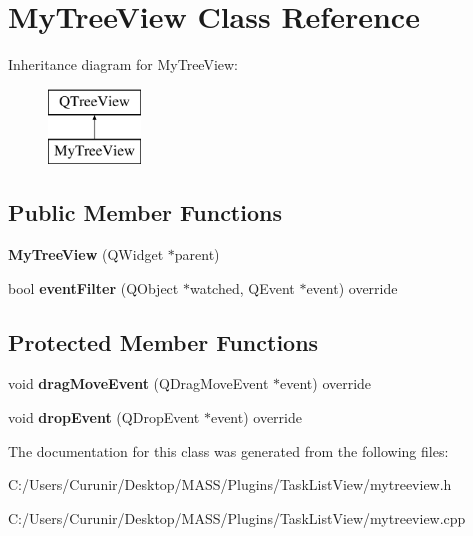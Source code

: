 \hypertarget{class_my_tree_view}{}\section{My\+Tree\+View Class Reference}
\label{class_my_tree_view}
Inheritance diagram for My\+Tree\+View\+:\begin{figure}[H]
\begin{center}
\leavevmode
\includegraphics[height=2.000000cm]{class_my_tree_view}
\end{center}
\end{figure}
\subsection*{Public Member Functions}
\begin{DoxyCompactItemize}
\item 
\mbox{\label{class_my_tree_view_a0152950a0b3c03fa3c17f2b5bcacfde1}} 
{\bfseries My\+Tree\+View} (Q\+Widget $\ast$parent)
\item 
\mbox{\label{class_my_tree_view_aa40b314b7834999905769ac19a21ad7d}} 
bool {\bfseries event\+Filter} (Q\+Object $\ast$watched, Q\+Event $\ast$event) override
\end{DoxyCompactItemize}
\subsection*{Protected Member Functions}
\begin{DoxyCompactItemize}
\item 
\mbox{\label{class_my_tree_view_afff3909f705a25758b55cc5ac0d9cf69}} 
void {\bfseries drag\+Move\+Event} (Q\+Drag\+Move\+Event $\ast$event) override
\item 
\mbox{\label{class_my_tree_view_adba311eaf413fc319f875a43e8bc1bdb}} 
void {\bfseries drop\+Event} (Q\+Drop\+Event $\ast$event) override
\end{DoxyCompactItemize}


The documentation for this class was generated from the following files\+:\begin{DoxyCompactItemize}
\item 
C\+:/\+Users/\+Curunir/\+Desktop/\+M\+A\+S\+S/\+Plugins/\+Task\+List\+View/mytreeview.\+h\item 
C\+:/\+Users/\+Curunir/\+Desktop/\+M\+A\+S\+S/\+Plugins/\+Task\+List\+View/mytreeview.\+cpp\end{DoxyCompactItemize}
